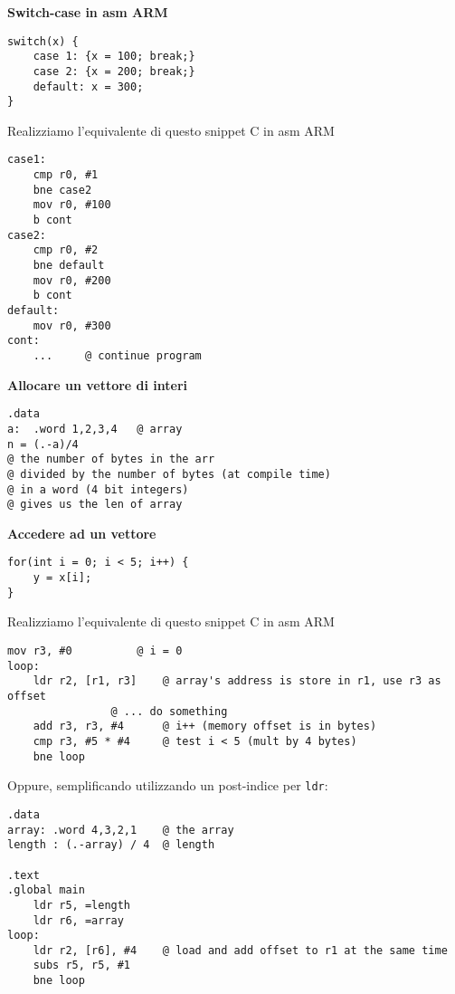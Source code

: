 \begin{defn}
\textbf{Switch-case in asm ARM}

\begin{lstlisting}
switch(x) {
	case 1: {x = 100; break;}
	case 2: {x = 200; break;}
	default: x = 300;
}
\end{lstlisting}

Realizziamo l'equivalente di questo snippet C in asm ARM

\begin{lstlisting}[style=armn]
case1:
	cmp r0, #1
	bne case2
	mov r0, #100
	b cont
case2:
	cmp r0, #2
	bne default
	mov r0, #200
	b cont
default:
	mov r0, #300
cont:
	... 	@ continue program
\end{lstlisting}
\end{defn}

\begin{exmp}
	\textbf{Allocare un vettore di interi}

\begin{lstlisting}[style=armn]
.data
a:	.word 1,2,3,4	@ array
n =	(.-a)/4
@ the number of bytes in the arr
@ divided by the number of bytes (at compile time)
@ in a word (4 bit integers)
@ gives us the len of array
\end{lstlisting}
\end{exmp}

\begin{exmp}
\textbf{Accedere ad un vettore}
\begin{lstlisting}
for(int i = 0; i < 5; i++) {
	y = x[i];
}
\end{lstlisting}

Realizziamo l'equivalente di questo snippet C in asm ARM

\begin{lstlisting}[style=armn]
mov r3, #0 			@ i = 0
loop:
	ldr r2, [r1, r3]	@ array's address is store in r1, use r3 as offset
				@ ... do something
	add r3, r3, #4 		@ i++ (memory offset is in bytes)
	cmp r3, #5 * #4		@ test i < 5 (mult by 4 bytes)
	bne loop
\end{lstlisting}

Oppure, semplificando utilizzando un post-indice per \texttt{ldr}:

\begin{lstlisting}[style=armn]
.data
array: .word 4,3,2,1    @ the array
length : (.-array) / 4	@ length

.text
.global main
	ldr r5, =length
	ldr r6, =array
loop:
	ldr r2, [r6], #4	@ load and add offset to r1 at the same time
	subs r5, r5, #1
	bne loop
\end{lstlisting}
\end{exmp}

